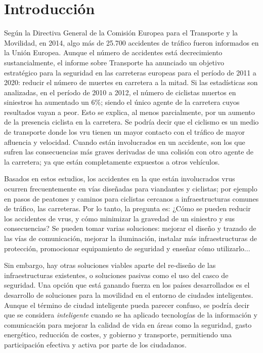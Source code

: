 \chapter{Introducción}
Según la Directiva General de la Comisión Europea para el Transporte y la Movilidad, en 2014, algo más de 25.700 accidentes de tráfico fueron informados en la Unión Europea. Aunque el número de accidentes está decrecimiento sustancialmente, el informe sobre Transporte ha anunciado un objetivo estratégico para la seguridad en las carreteras europeas para el período de 2011 a 2020: reducir el número de muertes en carretera a la mitad. Si las estadísticas son analizadas, en el período de 2010 a 2012, el número de ciclistas muertos en siniestros ha aumentado un 6\%; siendo el único agente de la carretera cuyos resultados vayan a peor. Esto se explica, al menos parcialmente, por un aumento de la presencia ciclista en la carretera. Se podría decir que el ciclismo es un medio de transporte donde los \gls{vru} tienen un mayor contacto con el tráfico de mayor afluencia y velocidad. Cuando están involucrados en un accidente, son los que sufren las consecuencias más graves derivadas de una colisión con otro agente de la carretera; ya que están completamente expuestos a otros vehículos.

Basados en estos estudios, los accidentes en la que están involucrados \gls{vru}s ocurren frecuentemente en vías diseñadas para viandantes y ciclistas; por ejemplo en pasos de peatones y caminos para ciclistas cercanos a infraestructuras comunes de tráfico, las carreteras. Por lo tanto, la pregunta es: ¿Cómo se pueden reducir los accidentes de \gls{vru}s, y cómo minimizar la gravedad de un siniestro y sus consecuencias? Se pueden tomar varias soluciones: mejorar el diseño y trazado de las vías de comunicación, mejorar la iluminación, instalar más infraestructuras de protección, promocionar equipamiento de seguridad y enseñar cómo utilizarlo...

Sin embargo, hay otras soluciones viables aparte del re-diseño de las infraestructuras existentes, o soluciones pasivas como el uso del casco de seguridad. Una opción que está ganando fuerza en los países desarrollados es el desarrollo de soluciones para la movilidad en el entorno de ciudades inteligentes. Aunque el término de ciudad inteligente pueda parecer confuso, se podría decir que se considera \emph{inteligente} cuando se ha aplicado tecnologías de la información y comunicación para mejorar la calidad de vida en áreas como la seguridad, gasto energético, reducción de costes, y gobierno y transporte, permitiendo una participación efectiva y activa por parte de los ciudadanos.

